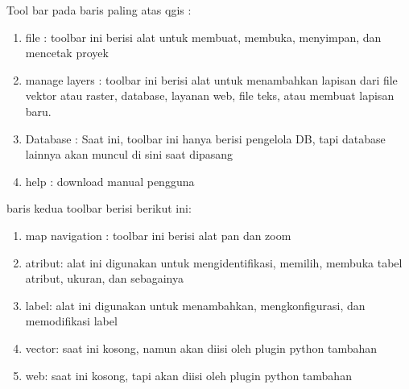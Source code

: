 	Tool bar pada baris paling atas qgis :
	\begin{enumerate}
		\item file : toolbar ini berisi alat untuk membuat, membuka, menyimpan, dan mencetak proyek
		\item manage layers : toolbar ini berisi alat untuk menambahkan lapisan dari file vektor atau raster, database, layanan web, file teks, atau membuat lapisan baru.
		\item Database : Saat ini, toolbar ini hanya berisi pengelola DB, tapi database lainnya akan muncul di sini saat dipasang
		\item help : download manual pengguna
	\end{enumerate}

	baris kedua toolbar berisi berikut ini:
	\begin{enumerate}
		\item map navigation : toolbar ini berisi alat pan dan zoom
		\item atribut: alat ini digunakan untuk mengidentifikasi, memilih, membuka tabel atribut, ukuran, dan sebagainya
		\item label: alat ini digunakan untuk menambahkan, mengkonfigurasi, dan memodifikasi label
		\item vector: saat ini kosong, namun akan diisi oleh plugin python tambahan
		\item web: saat ini kosong, tapi akan diisi oleh plugin python tambahan
	\end{enumerate}
